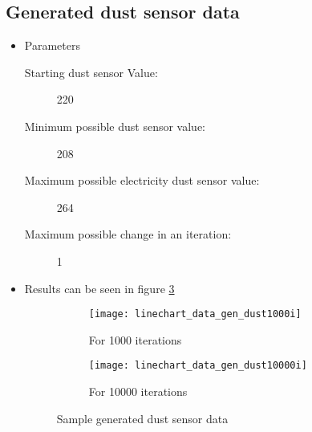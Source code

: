                 \subsection{Generated dust sensor data}
                    \begin{itemize}
                        \item Parameters
                            \begin{description}
                                \item[Starting dust sensor Value:] 220
                                \item[Minimum possible dust sensor value:] 208
                                \item[Maximum possible electricity dust sensor value:] 264
                                \item[Maximum possible change in an iteration:] 1
                            \end{description}
                        \item Results can be seen in figure \ref{fig:gen_dust}
                            \begin{figure}
                                \centering
                                \captionsetup{type=figure}
                                \begin{subfigure}[b]{0.45\textwidth}
                                    \centering
                                    \texttt{[image: linechart\_data\_gen\_dust1000i]}
                                    \caption{For 1000 iterations}
                                    \label{chart:gen_dust_1000}
                                \end{subfigure}
                                \hfill
                                \begin{subfigure}[b]{0.45\textwidth}
                                    \centering
                                    \texttt{[image: linechart\_data\_gen\_dust10000i]}
                                    \caption{For 10000 iterations}
                                    \label{chart:gen_dust_10000}
                                \end{subfigure}
                                
                                \caption{Sample generated dust sensor data }
                                \label{fig:gen_dust}
                        \end{figure}
                    \end{itemize}
